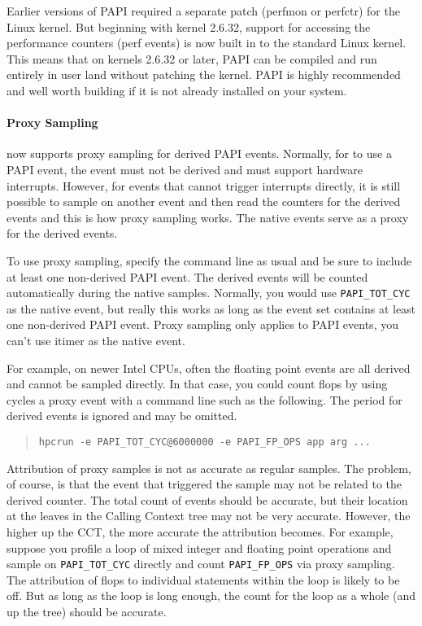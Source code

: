 Earlier versions of PAPI required a separate patch (perfmon or
perfctr) for the Linux kernel.  But beginning with kernel 2.6.32,
support for accessing the performance counters (perf events) is now
built in to the standard Linux kernel.  This means that on kernels
2.6.32 or later, PAPI can be compiled and run entirely in user land
without patching the kernel.  PAPI is highly recommended and well
worth building if it is not already installed on your system.

\paragraph{Proxy Sampling}

\HPCToolkit{} now supports proxy sampling for derived PAPI events.
Normally, for \HPCToolkit{} to use a PAPI event, the event must not be
derived and must support hardware interrupts.  However, for events
that cannot trigger interrupts directly, it is still possible to
sample on another event and then read the counters for the derived
events and this is how proxy sampling works.  The native events serve
as a proxy for the derived events.

To use proxy sampling, specify the \hpcrun{} command line as usual and
be sure to include at least one non-derived PAPI event.  The derived
events will be counted automatically during the native samples.
Normally, you would use \verb|PAPI_TOT_CYC| as the native event, but
really this works as long as the event set contains at least one
non-derived PAPI event.  Proxy sampling only applies to PAPI events,
you can't use itimer as the native event.

For example, on newer Intel CPUs, often the floating point events are
all derived and cannot be sampled directly.  In that case, you could
count flops by using cycles a proxy event with a command line such as
the following.  The period for derived events is ignored and may be
omitted.

\begin{quote}
\begin{verbatim}
hpcrun -e PAPI_TOT_CYC@6000000 -e PAPI_FP_OPS app arg ...
\end{verbatim}
\end{quote}

Attribution of proxy samples is not as accurate as regular samples.
The problem, of course, is that the event that triggered the sample
may not be related to the derived counter.  The total count of events
should be accurate, but their location at the leaves in the Calling
Context tree may not be very accurate.  However, the higher up the
CCT, the more accurate the attribution becomes.  For example, suppose
you profile a loop of mixed integer and floating point operations and
sample on \verb|PAPI_TOT_CYC| directly and count \verb|PAPI_FP_OPS|
via proxy sampling.  The attribution of flops to individual statements
within the loop is likely to be off.  But as long as the loop is long
enough, the count for the loop as a whole (and up the tree) should be
accurate.

